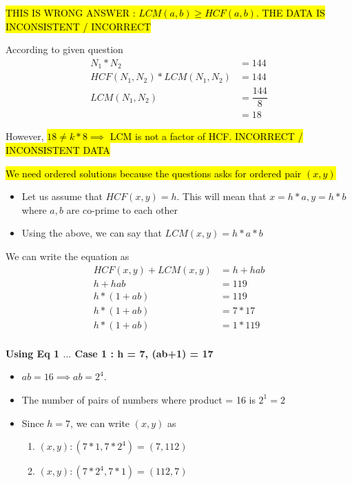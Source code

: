 \hl{THIS IS WRONG ANSWER : $LCM(a,b) \geq HCF(a,b)$. THE DATA IS INCONSISTENT / INCORRECT}


According to given question
\begin{align*}
    N_1 * N_2 &= 144 \\
    HCF(N_1,N_2) * LCM(N_1,N_2) &= 144 \\
    LCM(N_1,N_2) &= \dfrac{144}{8} \\
    &= 18
\end{align*}

However, \hl{$18 \neq k * 8 \implies$ LCM is not a factor of HCF. INCORRECT / INCONSISTENT DATA}


\hl{We need ordered solutions because the questions asks for ordered pair $(x,y)$}

\begin{itemize}
    \item Let us assume that $HCF(x,y) = h$. This will mean that $x = h * a, y = h * b$ where $a,b$ are co-prime to each other
    \item Using the above, we can say that $LCM(x,y) = h * a * b$
\end{itemize}

We can write the equation as 
\begin{align*}
    HCF(x,y) + LCM(x,y) &= h + hab \\
    h + hab &= 119 \\
    h * (1 + ab) &= 119 \\
    h * (1 + ab) &= 7 * 17 \tag{Eq 1} \\
    h * (1 + ab) &= 1 * 119 \tag{Eq 2} \\
\end{align*}

\textbf{Using Eq 1 $\ldots$ Case 1 : h = 7, (ab+1) = 17}
\begin{itemize}
    \item $ab = 16 \implies ab = 2^4$.
    \item The number of pairs of numbers where product = 16 is $2^1 = 2$
    \item Since $h = 7$, we can write $(x,y)$ as
    \begin{enumerate}
        \item $(x,y) : (7 * 1, 7 * 2^4) = (7,112)$
        \item $(x,y) : (7 * 2^4, 7 * 1) = (112,7)$
    \end{enumerate}
\end{itemize}

